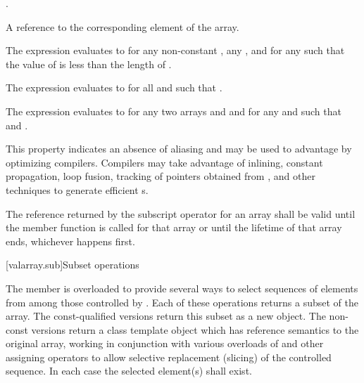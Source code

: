 \begin{itemdescr}
\pnum
\requires
{}.

\pnum
\returns
A reference to the corresponding element of the array.
\begin{note}
The expression 
evaluates to  for any non-constant ,
any , and for any 
such that the value of  is less than the length of .
\end{note}

\pnum
\remarks
The expression 
evaluates to  for all  and 
such that .

\pnum
The expression 
evaluates to  for any two arrays
 and  and for any
 and 
such that 
and .
\begin{note} This property indicates an absence of aliasing and may be used to
advantage by optimizing compilers. Compilers may take advantage
of inlining, constant propagation, loop fusion,
tracking of pointers obtained from
,
and other techniques to generate efficient
s.
\end{note}

\pnum
The reference returned by the subscript operator for an array shall
be valid until the member function
 is called for that array or until the lifetime of
that array ends, whichever happens first.
\end{itemdescr}

[valarray.sub]{Subset operations}

%
\pnum
The member  is overloaded to provide several ways to select
sequences of elements from among those controlled by . Each of these
operations returns a subset of the array. The const-qualified versions return this
subset as a new  object. The non-const versions return a class
template object which has reference semantics to the original array, working in
conjunction with various overloads of  and other assigning
operators to allow selective replacement (slicing) of the controlled sequence.
In each case the selected element(s) shall exist.

